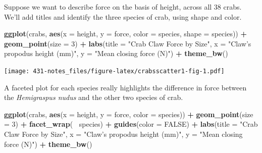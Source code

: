 \documentclass[
]{book}
\newenvironment{Shaded}{\begin{snugshade}}{\end{snugshade}}
\newcommand{\DataTypeTok}[1]{\textcolor[rgb]{0.13,0.29,0.53}{#1}}
\newcommand{\DecValTok}[1]{\textcolor[rgb]{0.00,0.00,0.81}{#1}}
\newcommand{\KeywordTok}[1]{\textcolor[rgb]{0.13,0.29,0.53}{\textbf{#1}}}
\newcommand{\NormalTok}[1]{#1}
\newcommand{\OperatorTok}[1]{\textcolor[rgb]{0.81,0.36,0.00}{\textbf{#1}}}
\newcommand{\OtherTok}[1]{\textcolor[rgb]{0.56,0.35,0.01}{#1}}
\newcommand{\StringTok}[1]{\textcolor[rgb]{0.31,0.60,0.02}{#1}}
\begin{document}
Suppose we want to describe force on the basis of height, across all 38 crabs. We'll add titles and identify the three species of crab, using shape and color.

\begin{Shaded}
\begin{Highlighting}[]
\KeywordTok{ggplot}\NormalTok{(crabs, }\KeywordTok{aes}\NormalTok{(}\DataTypeTok{x =}\NormalTok{ height, }\DataTypeTok{y =}\NormalTok{ force, }\DataTypeTok{color =}\NormalTok{ species, }\DataTypeTok{shape =}\NormalTok{ species)) }\OperatorTok{+}
\StringTok{    }\KeywordTok{geom_point}\NormalTok{(}\DataTypeTok{size =} \DecValTok{3}\NormalTok{) }\OperatorTok{+}
\StringTok{    }\KeywordTok{labs}\NormalTok{(}\DataTypeTok{title =} \StringTok{"Crab Claw Force by Size"}\NormalTok{, }
         \DataTypeTok{x =} \StringTok{"Claw's propodus height (mm)"}\NormalTok{, }\DataTypeTok{y =} \StringTok{"Mean closing force (N)"}\NormalTok{) }\OperatorTok{+}
\StringTok{    }\KeywordTok{theme_bw}\NormalTok{()}
\end{Highlighting}
\end{Shaded}

\texttt{[image: 431-notes\_files/figure-latex/crabsscatter1-fig-1.pdf]}

A faceted plot for each species really highlights the difference in force between the \emph{Hemigraspus nudus} and the other two species of crab.

\begin{Shaded}
\begin{Highlighting}[]
\KeywordTok{ggplot}\NormalTok{(crabs, }\KeywordTok{aes}\NormalTok{(}\DataTypeTok{x =}\NormalTok{ height, }\DataTypeTok{y =}\NormalTok{ force, }\DataTypeTok{color =}\NormalTok{ species)) }\OperatorTok{+}
\StringTok{    }\KeywordTok{geom_point}\NormalTok{(}\DataTypeTok{size =} \DecValTok{3}\NormalTok{) }\OperatorTok{+}
\StringTok{    }\KeywordTok{facet_wrap}\NormalTok{(}\OperatorTok{~}\StringTok{ }\NormalTok{species) }\OperatorTok{+}
\StringTok{    }\KeywordTok{guides}\NormalTok{(}\DataTypeTok{color =} \OtherTok{FALSE}\NormalTok{) }\OperatorTok{+}
\StringTok{    }\KeywordTok{labs}\NormalTok{(}\DataTypeTok{title =} \StringTok{"Crab Claw Force by Size"}\NormalTok{, }
         \DataTypeTok{x =} \StringTok{"Claw's propodus height (mm)"}\NormalTok{, }\DataTypeTok{y =} \StringTok{"Mean closing force (N)"}\NormalTok{) }\OperatorTok{+}
\StringTok{    }\KeywordTok{theme_bw}\NormalTok{()}
\end{Highlighting}
\end{Shaded}
\end{document}
